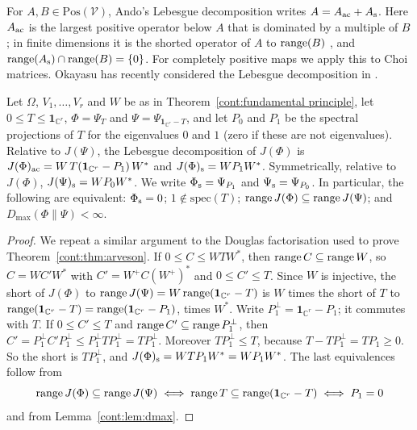 For $A,B\in\mathrm{Pos}(\mathcal{V})$, Ando's Lebesgue decomposition \cite{Ando1976} writes $A=A_{\rm ac}+A_{\rm s}$. Here $A_{\rm ac}$ is the largest positive operator below $A$ that is dominated by a multiple of $B$; in finite dimensions it is the shorted operator of $A$ to $\operatorname{range}(B)$ \cite{Anderson1971,AndersonTrapp1975}, and $\operatorname{range}(A_{\rm s})\cap\operatorname{range}(B)=\{0\}$. For completely positive maps we apply this to Choi matrices. Okayasu has recently considered the Lebesgue decomposition in \cite{Okayasu2026}.

\begin{proposition}\label{cont:prop:lebesgue cp}
Let $\Omega$, $V_1,\dots,V_r$ and $W$ be as in Theorem~\ref{cont:fundamental principle}, let $0\leq T\leq\mathbf{1}_{\mathbb{C}^r}$, $\Phi=\Psi_T$ and $\Psi=\Psi_{\mathbf{1}_{\mathbb{C}^r}-T}$, and let $P_0$ and $P_1$ be the spectral projections of $T$ for the eigenvalues $0$ and $1$ (zero if these are not eigenvalues). Relative to $J(\Psi)$, the Lebesgue decomposition of $J(\Phi)$ is $J(\Phi)_{\rm ac}=W\,T(\mathbf{1}_{\mathbb{C}^r}-P_1)\,W^*$ and $J(\Phi)_{\rm s}=WP_1W^*$. Symmetrically, relative to $J(\Phi)$, $J(\Psi)_{\rm s}=WP_0W^*$. We write $\Phi_{\rm s}=\Psi_{P_1}$ and $\Psi_{\rm s}=\Psi_{P_0}$. In particular, the following are equivalent: $\Phi_{\rm s}=0$; $1\notin\mathrm{spec}(T)$; $\operatorname{range} J(\Phi)\subseteq\operatorname{range} J(\Psi)$; and $D_{\max}(\Phi\|\Psi)<\infty$.
\end{proposition}

\begin{proof}
We repeat a similar argument to the Douglas factorisation used to prove Theorem~\ref{cont:thm:arveson}.
If $0\leq C\leq WTW^*$, then $\operatorname{range} C\subseteq\operatorname{range} W$, so $C=WC'W^*$ with $C'=W^+C(W^+)^*$ and $0\leq C'\leq T$. Since $W$ is injective, the short of $J(\Phi)$ to $\operatorname{range} J(\Psi)=W\operatorname{range}(\mathbf{1}_{\mathbb{C}^r}-T)$ is $W$ times the short of $T$ to $\operatorname{range}(\mathbf{1}_{\mathbb{C}^r}-T)=\operatorname{range}(\mathbf{1}_{\mathbb{C}^r}-P_1)$, times $W^*$. Write $P_1^\perp=\mathbf{1}_{\mathbb{C}^r}-P_1$; it commutes with $T$. If $0\leq C'\leq T$ and $\operatorname{range} C'\subseteq\operatorname{range} P_1^\perp$, then $C'=P_1^\perp C'P_1^\perp\leq P_1^\perp TP_1^\perp=TP_1^\perp$. Moreover $TP_1^\perp\leq T$, because $T-TP_1^\perp=TP_1\geq0$. So the short is $TP_1^\perp$, and $J(\Phi)_{\rm s}=WTP_1W^*=WP_1W^*$. The last equivalences follow from \[\operatorname{range} J(\Phi)\subseteq\operatorname{range} J(\Psi)\iff\operatorname{range} T\subseteq\operatorname{range}(\mathbf{1}_{\mathbb{C}^r}-T)\iff P_1=0\] and from Lemma~\ref{cont:lem:dmax}.
\end{proof}

